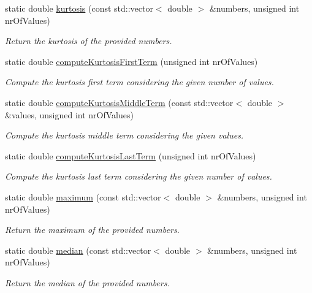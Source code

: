 \begin{DoxyCompactItemize}
static double \hyperlink{classmultiscale_1_1Numeric_ac857b047aafebf89a351bd7e7c3793eb}{kurtosis} (const std\-::vector$<$ double $>$ \&numbers, unsigned int nr\-Of\-Values)
\begin{DoxyCompactList}\small\item\em \-Return the kurtosis of the provided numbers. \end{DoxyCompactList}\item 
static double \hyperlink{classmultiscale_1_1Numeric_a6b506c0f002473f90df77068c1ac9d58}{compute\-Kurtosis\-First\-Term} (unsigned int nr\-Of\-Values)
\begin{DoxyCompactList}\small\item\em \-Compute the kurtosis first term considering the given number of values. \end{DoxyCompactList}\item 
static double \hyperlink{classmultiscale_1_1Numeric_a6c5a2d3f9af009d468211ee64b752bc4}{compute\-Kurtosis\-Middle\-Term} (const std\-::vector$<$ double $>$ \&values, unsigned int nr\-Of\-Values)
\begin{DoxyCompactList}\small\item\em \-Compute the kurtosis middle term considering the given values. \end{DoxyCompactList}\item 
static double \hyperlink{classmultiscale_1_1Numeric_a6b19a533b336330dc7c77eb9b8b7988b}{compute\-Kurtosis\-Last\-Term} (unsigned int nr\-Of\-Values)
\begin{DoxyCompactList}\small\item\em \-Compute the kurtosis last term considering the given number of values. \end{DoxyCompactList}\item 
static double \hyperlink{classmultiscale_1_1Numeric_ad7fb3a217ab798c89813c7fd2ff1fb0d}{maximum} (const std\-::vector$<$ double $>$ \&numbers, unsigned int nr\-Of\-Values)
\begin{DoxyCompactList}\small\item\em \-Return the maximum of the provided numbers. \end{DoxyCompactList}\item 
static double \hyperlink{classmultiscale_1_1Numeric_a6aabc739f68b2c8f39d7aeab3935a340}{median} (const std\-::vector$<$ double $>$ \&numbers, unsigned int nr\-Of\-Values)
\begin{DoxyCompactList}\small\item\em \-Return the median of the provided numbers. \end{DoxyCompactList}\item 

\end{DoxyCompactItemize}
